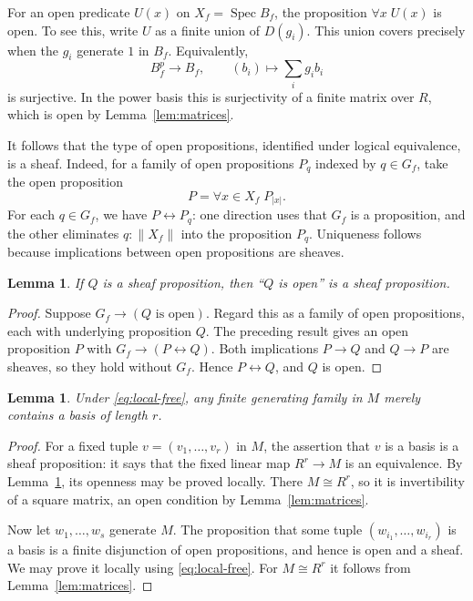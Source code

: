 \documentclass[11pt]{amsart}
\newtheorem{lemma}[theorem]{Lemma}
\theoremstyle{definition}
\newcommand{\Spec}{\operatorname{Spec}}
\newcommand{\tr}[1]{\lVert #1\rVert}
\begin{document}
For an open predicate $U(x)$ on $X_f=\Spec B_f$, the proposition
$\forall x\;U(x)$ is open. To see this, write $U$ as a finite union of
$D(g_i)$. This union covers precisely when the $g_i$ generate $1$ in
$B_f$. Equivalently,
\[
 B_f^p\longrightarrow B_f,\qquad(b_i)\longmapsto\sum_i g_ib_i
\]
is surjective. In the power basis this is surjectivity of a finite
matrix over $R$, which is open by Lemma~\ref{lem:matrices}.

It follows that the type of open propositions, identified under logical
equivalence, is a sheaf. Indeed, for a family of open propositions $P_q$
indexed by $q\in G_f$, take the open proposition
\[
 P=\forall x\in X_f\;P_{|x|}.
\]
For each $q\in G_f$, we have $P\leftrightarrow P_q$: one direction uses
that $G_f$ is a proposition, and the other eliminates $q:\tr{X_f}$ into
the proposition $P_q$. Uniqueness follows because implications between
open propositions are sheaves.

\begin{lemma}\label{lem:open-local}
If $Q$ is a sheaf proposition, then ``$Q$ is open'' is a sheaf proposition.
\end{lemma}
\begin{proof}
Suppose $G_f\to(Q\text{ is open})$. Regard this as a family of open
propositions, each with underlying proposition $Q$. The preceding result
gives an open proposition $P$ with $G_f\to(P\leftrightarrow Q)$.
Both implications $P\to Q$ and $Q\to P$ are sheaves, so they hold
without $G_f$. Hence $P\leftrightarrow Q$, and $Q$ is open.
\end{proof}

\begin{lemma}\label{lem:basis-among-generators}
Under \eqref{eq:local-free}, any finite generating family in $M$ merely
contains a basis of length $r$.
\end{lemma}
\begin{proof}
For a fixed tuple $v=(v_1,\ldots,v_r)$ in $M$, the assertion that $v$ is
a basis is a sheaf proposition: it says that the fixed linear map
$R^r\to M$ is an equivalence. By Lemma~\ref{lem:open-local}, its openness
may be proved locally. There $M\cong R^r$, so it is invertibility of a
square matrix, an open condition by Lemma~\ref{lem:matrices}.

Now let $w_1,\ldots,w_s$ generate $M$. The proposition that some tuple
$(w_{i_1},\ldots,w_{i_r})$ is a basis is a finite disjunction of open
propositions, and hence is open and a sheaf. We may prove it locally
using \eqref{eq:local-free}. For $M\cong R^r$ it follows from
Lemma~\ref{lem:matrices}.
\end{proof}
\end{document}
